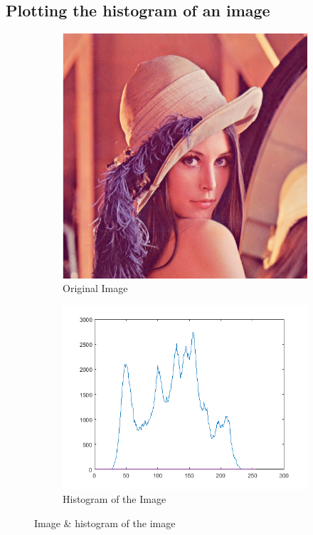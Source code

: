 \documentclass[a4paper,16pt]{article}
\begin{document}
	\subsection{Plotting the histogram of an image}
	\vspace{0.2in}
		
		\vspace{0.4in}
		\begin{figure}[h!]
			\begin{subfigure}[h]{0.4\linewidth}
				\includegraphics[width=\linewidth]{original}
				\caption{Original Image}
			\end{subfigure}
			\begin{subfigure}[h]{0.7\linewidth}
				\includegraphics[width=\linewidth]{histogram}
				\caption{Histogram of the Image}
			\end{subfigure}%
			\caption{Image \& histogram of the image}
		\end{figure}
	\newpage
\end{document}
